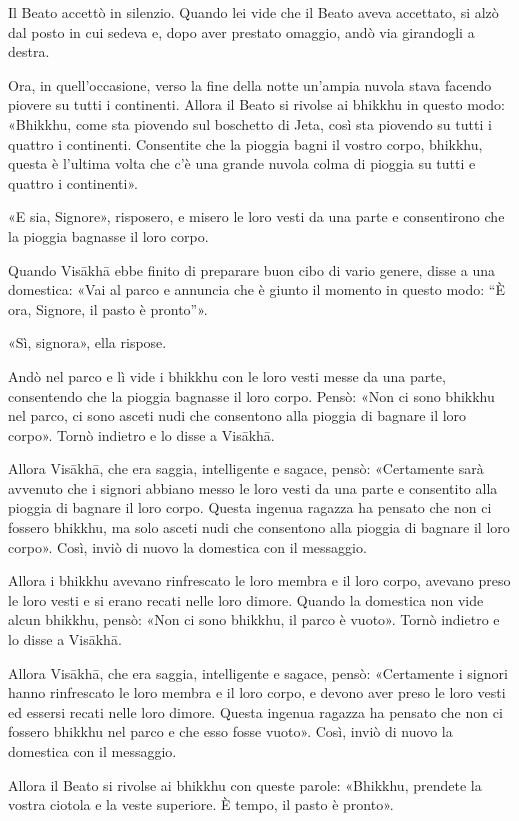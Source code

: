 Il Beato accettò in silenzio. Quando lei vide che il Beato aveva accettato, si
alzò dal posto in cui sedeva e, dopo aver prestato omaggio, andò via girandogli
a destra.

Ora, in quell’occasione, verso la fine della notte un’ampia nuvola stava facendo
piovere su tutti i continenti. Allora il Beato si rivolse ai bhikkhu in questo
modo: «Bhikkhu, come sta piovendo sul boschetto di Jeta, così sta piovendo su
tutti i quattro i continenti. Consentite che la pioggia bagni il vostro corpo,
bhikkhu, questa è l’ultima volta che c’è una grande nuvola colma di pioggia su
tutti e quattro i continenti».

«E sia, Signore», risposero, e misero le loro vesti da una parte e consentirono
che la pioggia bagnasse il loro corpo.

Quando Visākhā ebbe finito di preparare buon cibo di vario genere, disse a una
domestica: «Vai al parco e annuncia che è giunto il momento in questo modo: “È
ora, Signore, il pasto è pronto”».

«Sì, signora», ella rispose.

Andò nel parco e lì vide i bhikkhu con le loro vesti messe da una parte,
consentendo che la pioggia bagnasse il loro corpo. Pensò: «Non ci sono bhikkhu
nel parco, ci sono asceti nudi che consentono alla pioggia di bagnare il loro
corpo». Tornò indietro e lo disse a Visākhā.

Allora Visākhā, che era saggia, intelligente e sagace, pensò: «Certamente sarà
avvenuto che i signori abbiano messo le loro vesti da una parte e consentito
alla pioggia di bagnare il loro corpo. Questa ingenua ragazza ha pensato che non
ci fossero bhikkhu, ma solo asceti nudi che consentono alla pioggia di bagnare
il loro corpo». Così, inviò di nuovo la domestica con il messaggio.

Allora i bhikkhu avevano rinfrescato le loro membra e il loro corpo, avevano
preso le loro vesti e si erano recati nelle loro dimore. Quando la domestica non
vide alcun bhikkhu, pensò: «Non ci sono bhikkhu, il parco è vuoto». Tornò
indietro e lo disse a Visākhā.

Allora Visākhā, che era saggia, intelligente e sagace, pensò: «Certamente i
signori hanno rinfrescato le loro membra e il loro corpo, e devono aver preso le
loro vesti ed essersi recati nelle loro dimore. Questa ingenua ragazza ha
pensato che non ci fossero bhikkhu nel parco e che esso fosse vuoto». Così,
inviò di nuovo la domestica con il messaggio.

Allora il Beato si rivolse ai bhikkhu con queste parole: «Bhikkhu, prendete la
vostra ciotola e la veste superiore. È tempo, il pasto è pronto».

